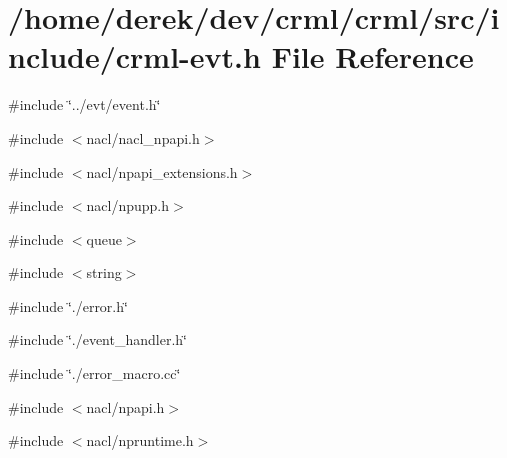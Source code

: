 \hypertarget{crml-evt_8h}{
\section{/home/derek/dev/crml/crml/src/include/crml-\/evt.h File Reference}
\label{crml-evt_8h}
}
{\ttfamily \#include \char`\"{}../evt/event.h\char`\"{}}\par
{\ttfamily \#include $<$nacl/nacl\_\-npapi.h$>$}\par
{\ttfamily \#include $<$nacl/npapi\_\-extensions.h$>$}\par
{\ttfamily \#include $<$nacl/npupp.h$>$}\par
{\ttfamily \#include $<$queue$>$}\par
{\ttfamily \#include $<$string$>$}\par
{\ttfamily \#include \char`\"{}./error.h\char`\"{}}\par
{\ttfamily \#include \char`\"{}./event\_\-handler.h\char`\"{}}\par
{\ttfamily \#include \char`\"{}./error\_\-macro.cc\char`\"{}}\par
{\ttfamily \#include $<$nacl/npapi.h$>$}\par
{\ttfamily \#include $<$nacl/npruntime.h$>$}\par

